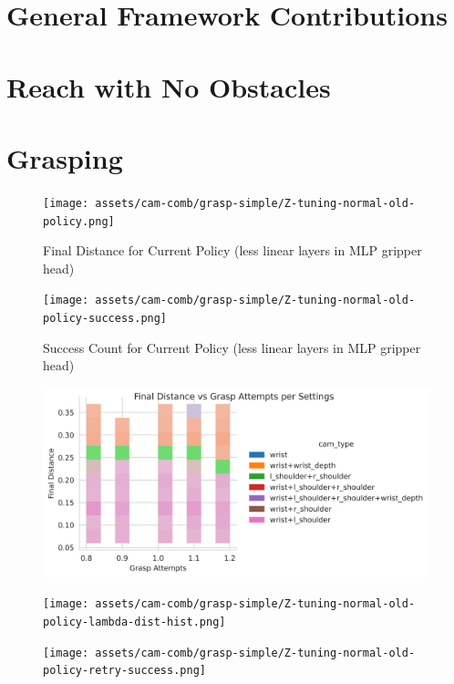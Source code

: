 \section{General Framework Contributions}


\section{Reach with No Obstacles}

\section{Grasping}

\begin{figure}[H] 
  \centering
  \texttt{[image: assets/cam-comb/grasp-simple/Z-tuning-normal-old-policy.png]}
  \caption{Final Distance for Current Policy (less linear layers in MLP gripper head)}
\end{figure}

\begin{figure}[H] 
  \centering
  \texttt{[image: assets/cam-comb/grasp-simple/Z-tuning-normal-old-policy-success.png]}
  \caption{Success Count for Current Policy (less linear layers in MLP gripper head)}
\end{figure}

\begin{figure}[H] 
  \centering
  \includegraphics[scale=0.6]{assets/cam-comb/grasp-simple/Z-tuning-normal-old-policy-lambda-dist-hist-hue-cams.png}
  \caption{}
\end{figure}


\begin{figure}[H] 
  \centering
  \texttt{[image: assets/cam-comb/grasp-simple/Z-tuning-normal-old-policy-lambda-dist-hist.png]}
  \caption{}
\end{figure}

\begin{figure}[H] 
  \centering
  \texttt{[image: assets/cam-comb/grasp-simple/Z-tuning-normal-old-policy-retry-success.png]}
  \caption{}
\end{figure}

